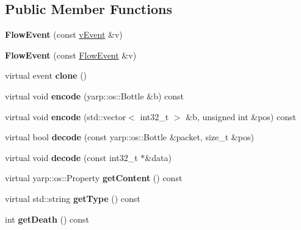\subsection*{Public Member Functions}
\begin{DoxyCompactItemize}
\item 
\mbox{\label{classev_1_1FlowEvent_aa268bbbeb75a7ec0634e7eff9bf9dda5}} 
{\bfseries Flow\+Event} (const \hyperlink{classev_1_1vEvent}{v\+Event} \&v)
\item 
\mbox{\label{classev_1_1FlowEvent_a0784e0ce0b0b1fb1d9c61f8134efa70b}} 
{\bfseries Flow\+Event} (const \hyperlink{classev_1_1FlowEvent}{Flow\+Event} \&v)
\item 
\mbox{\label{classev_1_1FlowEvent_a6a108ba6028ea69a9398745074d7300f}} 
virtual event {\bfseries clone} ()
\item 
\mbox{\label{classev_1_1FlowEvent_a5105689e47975ead26caf7b68b62463e}} 
virtual void {\bfseries encode} (yarp\+::os\+::\+Bottle \&b) const
\item 
\mbox{\label{classev_1_1FlowEvent_a4861e688ba3175ab80f0e2cbd3cc477b}} 
virtual void {\bfseries encode} (std\+::vector$<$ int32\+\_\+t $>$ \&b, unsigned int \&pos) const
\item 
\mbox{\label{classev_1_1FlowEvent_a0c6e4d68d303d9cc4016959dc065c12a}} 
virtual bool {\bfseries decode} (const yarp\+::os\+::\+Bottle \&packet, size\+\_\+t \&pos)
\item 
\mbox{\label{classev_1_1FlowEvent_af10d2b90b62f4c45dffc33abea193d09}} 
virtual void {\bfseries decode} (const int32\+\_\+t $\ast$\&data)
\item 
\mbox{\label{classev_1_1FlowEvent_affda6cd024d5edc8d9d437d3194cc8c4}} 
virtual yarp\+::os\+::\+Property {\bfseries get\+Content} () const
\item 
\mbox{\label{classev_1_1FlowEvent_ab2544edc7563366b97bf69c229b797fe}} 
virtual std\+::string {\bfseries get\+Type} () const
\item 
\mbox{\label{classev_1_1FlowEvent_a550ab5ead40a7107247a64ab83492002}} 
int {\bfseries get\+Death} () const
\end{DoxyCompactItemize}
